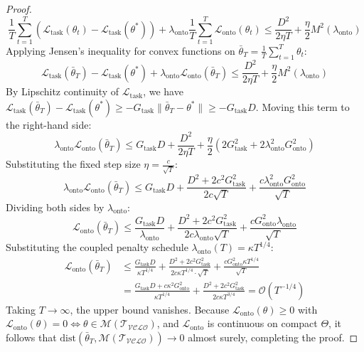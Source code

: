 \documentclass[11pt,a4paper]{article}
\begin{document}
\begin{proof}
\begin{equation}
\frac{1}{T} \sum_{t=1}^T \left(\mathcal{L}_{\text{task}}(\theta_t) - \mathcal{L}_{\text{task}}(\theta^*)\right) + \lambda_{\text{onto}} \frac{1}{T} \sum_{t=1}^T \mathcal{L}_{\text{onto}}(\theta_t) \le \frac{D^2}{2 \eta T} + \frac{\eta}{2} M^2(\lambda_{\text{onto}})
\end{equation}
Applying Jensen's inequality for convex functions on $\bar{\theta}_T = \frac{1}{T} \sum_{t=1}^T \theta_t$:
\begin{equation}
\mathcal{L}_{\text{task}}(\bar{\theta}_T) - \mathcal{L}_{\text{task}}(\theta^*) + \lambda_{\text{onto}} \mathcal{L}_{\text{onto}}(\bar{\theta}_T) \le \frac{D^2}{2 \eta T} + \frac{\eta}{2} M^2(\lambda_{\text{onto}})
\end{equation}
By Lipschitz continuity of $\mathcal{L}_{\text{task}}$, we have $\mathcal{L}_{\text{task}}(\bar{\theta}_T) - \mathcal{L}_{\text{task}}(\theta^*) \ge - G_{\text{task}} \|\bar{\theta}_T - \theta^*\| \ge - G_{\text{task}} D$.
Moving this term to the right-hand side:
\begin{equation}
\lambda_{\text{onto}} \mathcal{L}_{\text{onto}}(\bar{\theta}_T) \le G_{\text{task}} D + \frac{D^2}{2 \eta T} + \frac{\eta}{2} \left(2 G_{\text{task}}^2 + 2 \lambda_{\text{onto}}^2 G_{\text{onto}}^2\right)
\end{equation}
Substituting the fixed step size $\eta = \frac{c}{\sqrt{T}}$:
\begin{equation}
\lambda_{\text{onto}} \mathcal{L}_{\text{onto}}(\bar{\theta}_T) \le G_{\text{task}} D + \frac{D^2 + 2 c^2 G_{\text{task}}^2}{2 c \sqrt{T}} + \frac{c \lambda_{\text{onto}}^2 G_{\text{onto}}^2}{\sqrt{T}}
\end{equation}
Dividing both sides by $\lambda_{\text{onto}}$:
\begin{equation}
\mathcal{L}_{\text{onto}}(\bar{\theta}_T) \le \frac{G_{\text{task}} D}{\lambda_{\text{onto}}} + \frac{D^2 + 2 c^2 G_{\text{task}}^2}{2 c \lambda_{\text{onto}} \sqrt{T}} + \frac{c G_{\text{onto}}^2 \lambda_{\text{onto}}}{\sqrt{T}}
\end{equation}
Substituting the coupled penalty schedule $\lambda_{\text{onto}}(T) = \kappa T^{1/4}$:
\begin{align}
\mathcal{L}_{\text{onto}}(\bar{\theta}_T) &\le \frac{G_{\text{task}} D}{\kappa T^{1/4}} + \frac{D^2 + 2 c^2 G_{\text{task}}^2}{2 c \kappa T^{1/4} \cdot \sqrt{T}} + \frac{c G_{\text{onto}}^2 \kappa T^{1/4}}{\sqrt{T}} \\
&= \frac{G_{\text{task}} D + c \kappa^2 G_{\text{onto}}^2}{\kappa T^{1/4}} + \frac{D^2 + 2 c^2 G_{\text{task}}^2}{2 c \kappa T^{3/4}} = \mathcal{O}\left( T^{-1/4} \right)
\end{align}
Taking $T \to \infty$, the upper bound vanishes. Because $\mathcal{L}_{\text{onto}}(\theta) \ge 0$ with $\mathcal{L}_{\text{onto}}(\theta) = 0 \iff \theta \in \mathcal{M}(\mathcal{T}_{\mathcal{VCLO}})$, and $\mathcal{L}_{\text{onto}}$ is continuous on compact $\Theta$, it follows that $\mathrm{dist}(\bar{\theta}_T, \mathcal{M}(\mathcal{T}_{\mathcal{VCLO}})) \to 0$ almost surely, completing the proof.
\end{proof}
\end{document}

